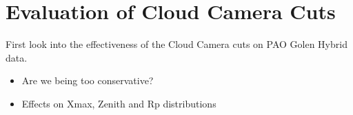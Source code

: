 \chapter[Evaluation of Cloud Camera Cuts]{\centering Evaluation of Cloud Camera Cuts \\}\label{Ch:CloudCuts}

First look into the effectiveness of the Cloud Camera cuts on PAO Golen Hybrid data.
\begin{itemize}
\item Are we being too conservative?
\item Effects on Xmax, Zenith and Rp distributions
\end{itemize}  